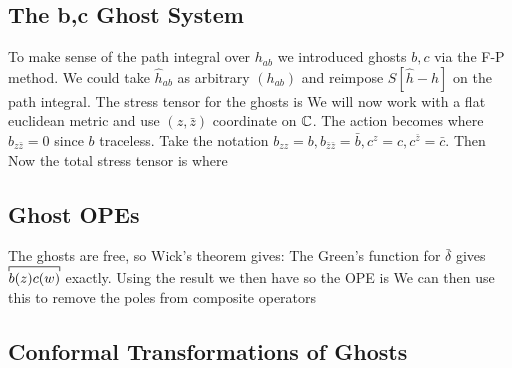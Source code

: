 \documentclass{article}
\begin{document}
\subsection{The b,c Ghost System}
To make sense of the path integral over $h_{ab}$ we introduced ghosts $b,c$ via the F-P method. 
We could take $\hat{h}_{ab}$ as arbitrary $(h_{ab})$ and reimpose $S[\hat{h}-h]$ on the path integral. The stress tensor for the ghosts is 
We will now work with a flat euclidean metric and use $(z,\bar{z})$ coordinate on $\mathbb{C}$. The action becomes 
where $b_{z\bar{z}}=0$ since $b$ traceless. Take the notation $b_{zz} = b, b_{\bar{z}\bar{z}}=\bar{b}, c^z = c, c^{\bar{z}} = \bar{c}$. Then 
Now the total stress tensor is 
where 

\subsection{Ghost OPEs}
The ghosts are free, so Wick's theorem gives: 
The Green's function for $\bar{\delta}$ gives $\upwick{b(z) c(w)}$ exactly. Using the result 
we then have 
so the OPE is 
We can then use this to remove the poles from composite operators 

\subsection{Conformal Transformations of Ghosts}
\end{document}
